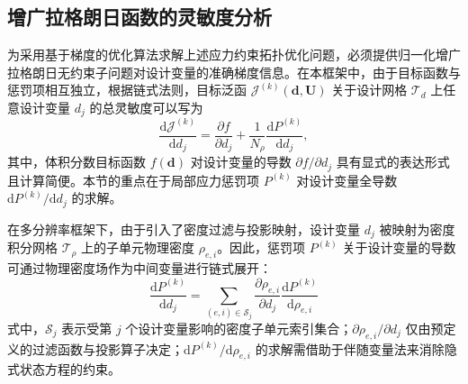 \subsection{增广拉格朗日函数的灵敏度分析}
\label{subsec:al_sensitivity}

为采用基于梯度的优化算法求解上述应力约束拓扑优化问题，必须提供归一化增广拉格朗日无约束子问题对设计变量的准确梯度信息。在本框架中，由于目标函数与惩罚项相互独立，根据链式法则，目标泛函 $\mathcal{J}^{(k)}(\boldsymbol{d}, \boldsymbol{U})$ 关于设计网格 $\mathcal{T}_d$ 上任意设计变量 $d_j$ 的总灵敏度可以写为
\[
\frac{\mathrm{d}\mathcal{J}^{(k)}}{\mathrm{d}d_j} = \frac{\partial f}{\partial d_j} + \frac{1}{N_\rho} \frac{\mathrm{d}P^{(k)}}{\mathrm{d}d_j},
\]
其中，体积分数目标函数 $f(\boldsymbol{d})$ 对设计变量的导数 $\partial f/\partial d_j$ 具有显式的表达形式且计算简便。本节的重点在于局部应力惩罚项 $P^{(k)}$ 对设计变量全导数 $\mathrm{d}P^{(k)}/\mathrm{d}d_j$ 的求解。

在多分辨率框架下，由于引入了密度过滤与投影映射，设计变量 $d_j$ 被映射为密度积分网格 $\mathcal{T}_\rho$ 上的子单元物理密度 $\rho_{e,i}$。因此，惩罚项 $P^{(k)}$ 关于设计变量的导数可通过物理密度场作为中间变量进行链式展开：
\[
\frac{\mathrm{d}P^{(k)}}{\mathrm{d}d_j} = \sum_{(e,i) \in \mathcal{S}_j} \frac{\partial \rho_{e,i}}{\partial d_j} \frac{\mathrm{d}P^{(k)}}{\mathrm{d}\rho_{e,i}}
\]
式中，$\mathcal{S}_j$ 表示受第 $j$ 个设计变量影响的密度子单元索引集合；$\partial \rho_{e,i}/\partial d_j$ 仅由预定义的过滤函数与投影算子决定；$\mathrm{d}P^{(k)}/\mathrm{d}\rho_{e,i}$ 的求解需借助于伴随变量法来消除隐式状态方程的约束。


